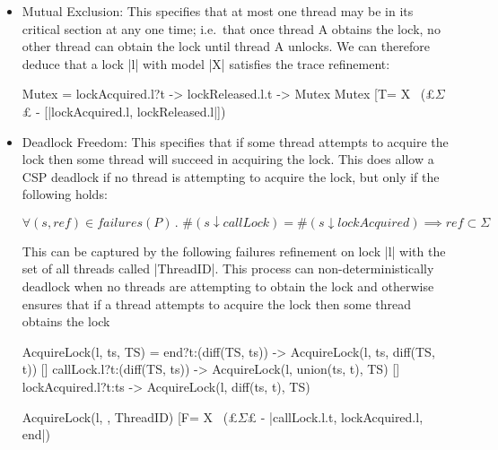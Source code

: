 \begin{itemize} 
  \item Mutual Exclusion: This specifies that at most one thread may be in its critical section at any one time; i.e.~that once thread A obtains the lock, no other thread can obtain the lock until thread A unlocks. We can therefore deduce that a lock |l| with model |X| satisfies the trace refinement:  
  
  \begin{cspm}
    Mutex = lockAcquired.l?t -> lockReleased.l.t -> Mutex
    Mutex [T= X \ (£$\Sigma$£ - [|lockAcquired.l, lockReleased.l|])\end{cspm}

  \item Deadlock Freedom: This specifies that if some thread attempts to acquire the lock then some thread will succeed in acquiring the lock\cite{TAoMP}. This does allow a CSP deadlock  if no thread is attempting to acquire the lock, but only if the following holds: 
  
  $\forall(s,ref) \in failures(P) \, . \,\, \#(s \downarrow callLock)= \#(s \downarrow lockAcquired) \implies ref \subset \Sigma $
  
  This can be captured by the following failures refinement on lock |l| with the set of all threads called |ThreadID|. This process can non-deterministically deadlock when no threads are attempting to obtain the lock and otherwise ensures that if a thread attempts to acquire the lock then some thread obtains the lock

  \begin{cspm}
    AcquireLock(l, ts, TS) = 
      end?t:(diff(TS, ts)) -> AcquireLock(l, ts, diff(TS, {t})) 
      [] callLock.l?t:(diff(TS, ts)) -> AcquireLock(l, union(ts, {t}), TS)
      [] lockAcquired.l?t:ts -> AcquireLock(l, diff(ts, {t}), TS)

    AcquireLock(l, {}, ThreadID) [F= 
        X \ (£$\Sigma$£ - {|callLock.l.t, lockAcquired.l, end|})
  \end{cspm}


\end{itemize}
